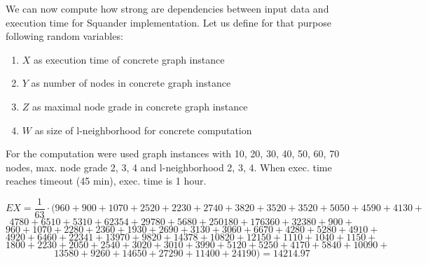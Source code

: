 \documentclass[11pt,twoside,a4paper]{book}
\begin{document}
\clearpage 
We can now compute how strong are dependencies between input data and execution
time for Squander implementation. Let us define for that purpose
following random variables:
\begin{enumerate}
  \item $X$ as execution time of concrete graph instance
  \item $Y$ as number of nodes in concrete graph instance
  \item $Z$ as maximal node grade in concrete graph instance
  \item $W$ as size of l-neighborhood for concrete computation
\end{enumerate}
For the computation were used graph instances with 10, 20, 30, 40, 50, 60, 70
nodes, max. node grade 2, 3, 4 and l-neighborhood  2, 3, 4. When exec. time
reaches timeout (45 min), exec. time is 1 hour.

$$EX = \frac{1}{63}\cdot(960  + 900  +1 070  + 2 520  + 2 230  
 + 2 740 + 3 820+ 3 520 + 3 520 + 5 050 + 4 590 + 4 130
+$$
$$4 780 + 6 510 +5 310+62 354+29 780+ 5 680 + 250 180+176 360 +32 380+ 900 +$$
 $$960 + 1 070 + 2 280 +2 360 + 1 930 +2 690 +3 130 +3 060 +6 670 +4 280+ 5
 280 +4 910 +$$
 $$4 920 +6 460+22 341 +13 970 +9 820+14 378 +10 820 + 12 150 +1 110+ 1 040+ 1
 150+$$ $$ 1 800 +2 230 + 2 050 +2 540 +3 020 +3 010 +3 990 +5 120+
 5 250+4 170 +5 840 +10 090+$$ 
 $$13 580+9 260+ 14 650+27 290 +11 400 +24 190) =14214.97$$

\end{document}
